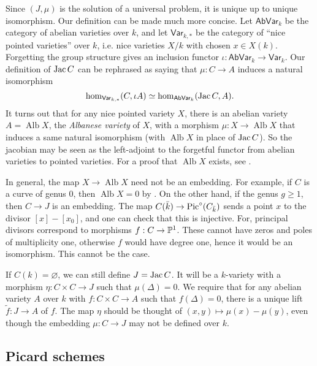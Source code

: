 \documentclass{article}
\begin{document}
Since $(J,\mu)$ is the solution of a universal problem, it is unique up to 
unique isomorphism. Our definition can be made much more concise. Let 
$\mathsf{AbVar}_k$ be the category of abelian varieties over $k$, and let 
$\mathsf{Var}_{k,\ast}$ be the category of ``nice pointed varieties'' over $k$, 
i.e. nice varieties $X/k$ with chosen $x\in X(k)$. Forgetting the group 
structure gives an inclusion functor 
$\iota:\mathsf{AbVar}_k\to \mathsf{Var}_k$. Our definition of $\operatorname{Jac} C$ can be 
rephrased as saying that $\mu:C\to A$ induces a natural isomorphism 
\[
  \hom_{\mathsf{Var}_{k,\ast}}(C,\iota A) \simeq \hom_{\mathsf{AbVar}_k}(\operatorname{Jac} C,A)\text{.}
\]
It turns out that for any nice pointed variety $X$, there is an abelian variety 
$A=\operatorname{Alb} X$, the \emph{Albanese variety} of $X$, with a morphism 
$\mu:X\to \operatorname{Alb} X$ that induces a same natural isomorphism (with 
$\operatorname{Alb} X$ in place of $\operatorname{Jac} C$). So the jacobian may be seen as 
the left-adjoint to the forgetful functor from abelian varieties to pointed 
varieties. For a proof that $\operatorname{Alb} X$ exists, see 
\cite[A.11]{mo12}.

In general, the map $X\to \operatorname{Alb} X$ need not be an embedding. 
For example, if $C$ is a curve of genus $0$, then $\operatorname{Alb} X=0$ by 
\cite[I.3.9]{mi}. On the other hand, if the genus $g\geqslant 1$, then 
$C\to J$ is an embedding. The map $C(\bar k)\to \operatorname{Pic}^\circ(C_{\bar k})$ sends 
a point $x$ to the divisor $[x]-[x_0]$, and one can check that this is 
injective. For, principal divisors correspond to morphisms 
$f:C\to\mathbb{P}^1$. These cannot have zeros and poles of multiplicity one, 
otherwise $f$ would have degree one, hence it would be an isomorphism. This 
cannot be the case. 

If $C(k)=\varnothing$, we can still define $J=\operatorname{Jac} C$. It will be a $k$-variety 
with a morphism $\eta:C\times C\to J$ such that $\mu(\Delta)=0$. We require 
that for any abelian variety $A$ over $k$ with $f:C\times C\to A$ such that 
$f(\Delta)=0$, there is a unique lift $\tilde f:J\to A$ of $f$. The map $\eta$ 
should be thought of $(x,y)\mapsto \mu(x)-\mu(y)$, even though the embedding 
$\mu:C\to J$ may not be defined over $k$. 





\subsection*{Picard schemes}
\end{document}
